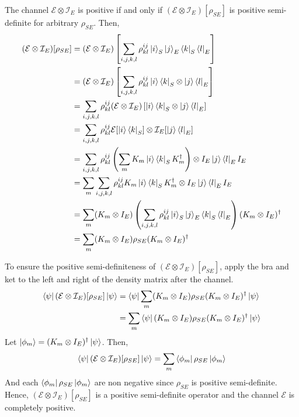 \documentclass[a4paper,11pt]{article}
\begin{document}
The channel $\mathcal E\otimes \mathcal I_E$ is positive if and only if $(\mathcal E\otimes \mathcal I_E)[\rho_{SE}]$ is positive semi-definite for arbitrary $\rho_{SE}$. Then,
\begin{align}
    (\mathcal E\otimes \mathcal I_E)[\rho_{SE}]
    &= (\mathcal E\otimes \mathcal I_E)\left[\sum_{i,j,k,l}\rho_{kl}^{ij}\ket{i}_S\ket{j}_E\bra{k}_S\bra{l}_E\right]\\
    &= (\mathcal E\otimes \mathcal I_E)\left[\sum_{i,j,k,l}\rho_{kl}^{ij}\ket{i} \bra{k}_S\otimes\ket{j}\bra{l}_E\right]\\
    &=\sum_{i,j,k,l}\rho_{kl}^{ij}(\mathcal E\otimes \mathcal I_E)\left[\ket{i} \bra{k}_S\otimes\ket{j}\bra{l}_E\right]\\
    &=\sum_{i,j,k,l}\rho_{kl}^{ij}\mathcal E[\ket{i} \bra{k}_S]\otimes \mathcal I_E[\ket{j}\bra{l}_E]\\
    &=\sum_{i,j,k,l}\rho_{kl}^{ij}\left(\sum_m K_m\ket{i} \bra{k}_SK_m^\dagger\right)\otimes I_E\ket{j}\bra{l}_E I_E\\
    &=\sum_m\sum_{i,j,k,l}\rho_{kl}^{ij}K_m\ket{i} \bra{k}_SK_m^\dagger\otimes I_E\ket{j}\bra{l}_E I_E\\
    &=\sum_m (K_m\otimes I_E)\left(\sum_{i,j,k,l}\rho_{kl}^{ij}\ket{i}_S\ket{j}_E\bra{k}_S\bra{l}_E\right) (K_m\otimes I_E)^\dagger\\
    &=\sum_m (K_m\otimes I_E)\rho_{SE} (K_m\otimes I_E)^\dagger
\end{align}

To ensure the positive semi-definiteness of $(\mathcal E\otimes \mathcal I_E)[\rho_{SE}]$, apply the bra and ket to the left and right of the density matrix after the channel.
\begin{align}
    \bra{\psi}(\mathcal E\otimes \mathcal I_E)[\rho_{SE}]\ket{\psi}
    &=\bra{\psi}\sum_m (K_m\otimes I_E)\rho_{SE} (K_m\otimes I_E)^\dagger\ket{\psi}\\
    &=\sum_m \bra{\psi}(K_m\otimes I_E)\rho_{SE} (K_m\otimes I_E)^\dagger\ket{\psi}
\end{align}
Let $\ket{\phi_m}=(K_m\otimes I_E)^\dagger\ket{\psi}$. Then,
\begin{equation}
    \bra{\psi}(\mathcal E\otimes \mathcal I_E)[\rho_{SE}]\ket{\psi}
    =\sum_m \bra{\phi_m}\rho_{SE}\ket{\phi_m}
\end{equation}
And each $\bra{\phi_m}\rho_{SE}\ket{\phi_m}$ are non negative since $\rho_{SE}$ is positive semi-definite. Hence, $(\mathcal E\otimes \mathcal I_E)[\rho_{SE}]$ is a positive semi-definite operator and the channel $\mathcal E$ is completely positive.
\end{document}
